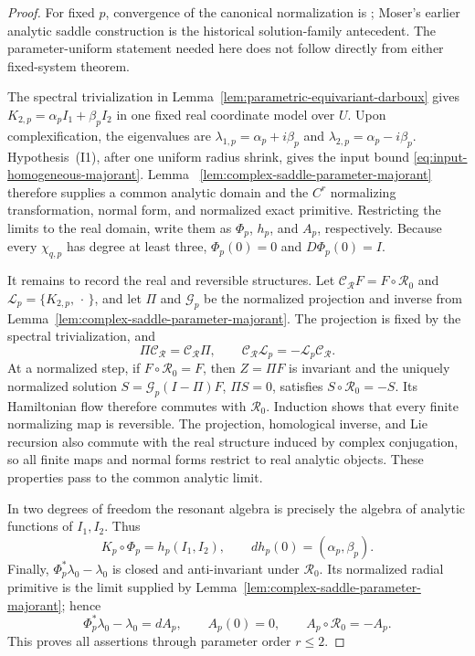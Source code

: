 \documentclass[11pt]{amsart}
\numberwithin{equation}{section}
\theoremstyle{definition}
\theoremstyle{remark}
\begin{document}
\begin{proof}
For fixed $p$, convergence of the canonical normalization is
\cite[Theorem~1, p.~856]{Giorgilli2001Unstable}; Moser's earlier analytic
saddle construction \cite{Moser1958Liapunoff} is the historical
solution-family antecedent.  The parameter-uniform statement needed here
does not follow directly from either fixed-system theorem.

The spectral trivialization in
Lemma~\ref{lem:parametric-equivariant-darboux} gives
$K_{2,p}=\alpha_pI_1+\beta_pI_2$ in one fixed real coordinate model over
$U$.  Upon complexification, the eigenvalues are
$\lambda_{1,p}=\alpha_p+i\beta_p$ and
$\lambda_{2,p}=\alpha_p-i\beta_p$.  Hypothesis~\textup{(I1)}, after one
uniform radius shrink, gives the input bound
\eqref{eq:input-homogeneous-majorant}.  Lemma~
\ref{lem:complex-saddle-parameter-majorant} therefore supplies a common
analytic domain and the $C^r$ normalizing transformation, normal form, and
normalized exact primitive.  Restricting the limits to the real domain,
write them as $\Phi_p$, $h_p$, and $A_p$, respectively.
Because every $\chi_{q,p}$ has degree at least three,
$\Phi_p(0)=0$ and $D\Phi_p(0)=I$.

It remains to record the real and reversible structures.  Let
$\mathcal C_{\mathcal R}F=F\circ\mathcal R_0$ and
$\mathcal L_p=\{K_{2,p},\,\cdot\,\}$, and let $\Pi$ and $\mathcal G_p$ be
the normalized projection and inverse from
Lemma~\ref{lem:complex-saddle-parameter-majorant}.  The projection is fixed
by the spectral trivialization, and
\[
 \Pi\mathcal C_{\mathcal R}=\mathcal C_{\mathcal R}\Pi,
 \qquad
 \mathcal C_{\mathcal R}\mathcal L_p
 =-\mathcal L_p\mathcal C_{\mathcal R}.
\]
At a normalized step, if $F\circ\mathcal R_0=F$, then $Z=\Pi F$ is
invariant and the uniquely normalized solution
$S=\mathcal G_p(I-\Pi)F$, $\Pi S=0$, satisfies
$S\circ\mathcal R_0=-S$.  Its Hamiltonian flow therefore commutes with
$\mathcal R_0$.  Induction shows that every finite normalizing map is
reversible.  The projection, homological inverse, and Lie recursion also
commute with the real structure induced by complex conjugation, so all
finite maps and normal forms restrict to real analytic objects.  These
properties pass to the common analytic limit.

In two degrees of freedom the resonant algebra is precisely the algebra
of analytic functions of $I_1,I_2$.  Thus
\[
 K_p\circ\Phi_p=h_p(I_1,I_2),\qquad
 dh_p(0)=(\alpha_p,\beta_p).
\]
Finally, $\Phi_p^*\lambda_0-\lambda_0$ is closed and anti-invariant under
$\mathcal R_0$.  Its normalized radial primitive is the limit supplied by
Lemma~\ref{lem:complex-saddle-parameter-majorant}; hence
\[
 \Phi_p^*\lambda_0-\lambda_0=dA_p,
 \qquad A_p(0)=0,
 \qquad A_p\circ\mathcal R_0=-A_p.
\]
This proves all assertions through parameter order $r\le2$.
\end{proof}
\end{document}
